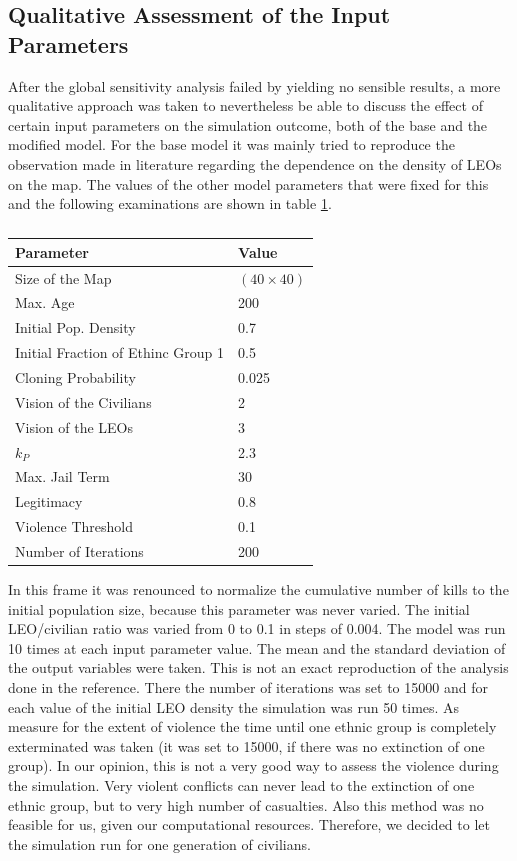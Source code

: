 \documentclass[11pt]{article}
\begin{document}
\subsection{Qualitative Assessment of the Input Parameters}
After the global sensitivity analysis failed by yielding no sensible results, a more qualitative approach was taken to nevertheless be able to discuss the effect of certain input parameters on the simulation outcome, both of the base and the modified model. For the base model it was mainly tried to reproduce the observation made in literature regarding the dependence on the density of LEOs on the map. The values of the other model parameters that were fixed for this and the following examinations are shown in table \ref{tab:values_parameters}.
\begin{table}[!htbp]
	\centering
	\caption{}
	\vspace{0.5 cm}
		\begin{tabular}{l | l}
		Parameter & Value\\
		\hline
		Size of the Map & $(40 \times 40)$\\
		Max. Age & 200\\
		Initial Pop. Density & 0.7\\
		Initial Fraction of Ethinc Group 1 & 0.5\\
		Cloning Probability & 0.025\\
		Vision of the Civilians & 2\\
		Vision of the LEOs & 3\\
		$k_P$ & 2.3\\
		Max. Jail Term & 30\\
		Legitimacy & 0.8\\
		Violence Threshold & 0.1\\
		Number of Iterations & 200\\
	\end{tabular}
	\label{tab:values_parameters}
\end{table}
In this frame it was renounced to normalize the cumulative number of kills to the initial population size, because this parameter was never varied. The initial LEO/civilian ratio was varied from 0 to 0.1 in steps of 0.004. The model was run 10 times at each input parameter value. The mean and the standard deviation of the output variables were taken. This is not an exact reproduction of the analysis done in the reference. There the number of iterations was set to 15000 and for each value of the initial LEO density the simulation was run 50 times. As measure for the extent of violence the time until one ethnic group is completely exterminated was taken (it was set to 15000, if there was no extinction of one group). In our opinion, this is not a very good way to assess the violence during the simulation. Very violent conflicts can never lead to the extinction of one ethnic group, but to very high number of casualties. Also this method was no feasible for us, given our computational resources. Therefore, we decided to let the simulation run for one generation of civilians.\\
\end{document}
